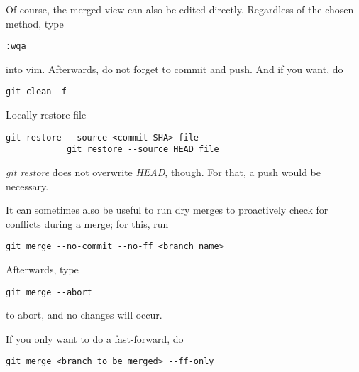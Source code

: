 \documentclass[12pt, a4paper]{article}
\numberwithin{equation}{section}
\theoremstyle{definition}
\theoremstyle{definition}
\begin{document}
		Of course, the merged view can also be edited directly. Regardless of the chosen method, type 
		
		\begin{lstlisting}[style=mystylebash, xleftmargin=\parindent]
			:wqa
		\end{lstlisting}
		
		into vim. Afterwards, do not forget to commit and push. And if you want, do 
		
		\begin{lstlisting}[style=mystylebash, label=alg:git_clean, xleftmargin=\parindent]
			git clean -f
		\end{lstlisting}

		Locally restore file
		
		\begin{lstlisting}[style=mystylebash, label=alg:git_restore, xleftmargin=\parindent]
			git restore --source <commit SHA> file
			git restore --source HEAD file
		\end{lstlisting}
		
		\textit{git restore} does not overwrite \textit{HEAD}, though. For that, a push would be necessary.  
		
		It can sometimes also be useful to run dry merges to proactively check for conflicts during a merge; for this, run
		
		\begin{lstlisting}[style=mystylebash, label=alg:git__dry_merge, xleftmargin=\parindent]
			git merge --no-commit --no-ff <branch_name>
		\end{lstlisting}

		Afterwards, type 

		\begin{lstlisting}[style=mystylebash, label=alg:git__abort_merge, xleftmargin=\parindent]
			git merge --abort
		\end{lstlisting}
		
		to abort, and no changes will occur.

		If you only want to do a fast-forward, do 

		\begin{lstlisting}[style=mystylebash, label=alg:git__ff_only, xleftmargin=\parindent]
			git merge <branch_to_be_merged> --ff-only
		\end{lstlisting}
\end{document}
